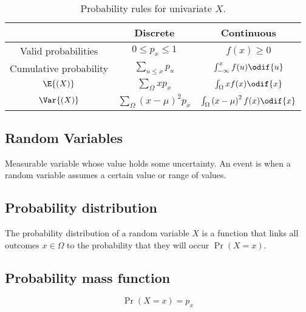 \documentclass{article}
\begin{document}
\begin{minipage}{126.1962963mm}
    \begin{table}[H]
        \centering
        \begin{tabular}{c c c }
            \toprule
                                       & \textbf{Discrete}                              & \textbf{Continuous}                                    \\
            \midrule
            Valid probabilities        & \(0 \leq p_x \leq 1\)                          & \(f(x) \geq 0\)                                        \\
            Cumulative probability     & \(\sum_{u \leq x} p_u\)                        & \(\int_{-\infty}^{x} f(u) \odif{u}\)                   \\
            \(\E{\left( X \right)}\)   & \(\sum_{\Omega} xp_x\)                         & \(\int_{\Omega} xf(x)\odif{x}\)                        \\
            \(\Var{\left( X \right)}\) & \(\sum_{\Omega} \left( x - \mu \right)^2 p_x\) & \(\int_{\Omega} \left( x - \mu \right)^2f(x)\odif{x}\) \\
            \bottomrule
        \end{tabular}
        \caption{Probability rules for univariate \(X\).} %
    \end{table}
    \begin{multicols}{2}
        \section{Random Variables}
        Measurable variable whose value holds some uncertainty.
        An event is when a random variable assumes a certain value or range of values.
        \subsection{Probability distribution}
        The probability distribution of a random variable \(X\) is a function that links all outcomes \(x \in \Omega\)
        to the probability that they will occur \(\Pr{\left( X = x \right)}\).
        \subsection{Probability mass function}
        \begin{equation*}
            \Pr{\left( X = x \right)} = p_x
        \end{equation*}

\end{multicols}
\end{minipage}
\end{document}
